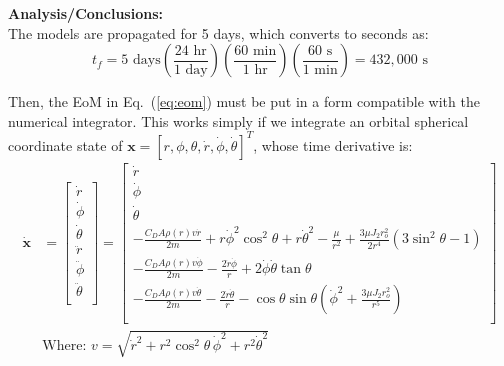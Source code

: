 \documentclass[titlepage]{article}
\begin{document}
\textbf{Analysis/Conclusions:}\\

The models are propagated for 5 days, which converts to seconds as:
\begin{equation}
	t_f=5\text{ days}\left(\frac{24\text{ hr}}{1\text{ day}}\right)\left(\frac{60\text{ min}}{1\text{ hr}}\right)\left(\frac{60\text{ s}}{1\text{ min}}\right)=432{,}000\text{ s}
\end{equation}

Then, the EoM in Eq.~(\ref{eq:eom}) must be put in a form compatible with the numerical integrator. This works simply if we integrate an orbital spherical coordinate state of $\boldsymbol{x}=[r,\phi,\theta,\dot{r},\dot{\phi},\dot{\theta}]^T$, whose time derivative is:
\begin{equation}
	\begin{split}
		\dot{\boldsymbol{x}}&=
		\begin{bmatrix}
			\dot{r} \\
			\dot{\phi} \\
			\dot{\theta} \\
			\ddot{r} \\
			\ddot{\phi} \\
			\ddot{\theta} \\
		\end{bmatrix}
		=
		\begin{bmatrix}
			\dot{r} \\
			\dot{\phi} \\
			\dot{\theta} \\
			-\frac{C_DA\rho(r)v\dot{r}}{2m}+r\dot{\phi}^2\cos^2\theta+r\dot{\theta}^2-\frac{\mu}{r^2}+\frac{3\mu J_2r_o^2}{2r^4}\left(3\sin^2\theta-1\right) \\
			-\frac{C_DA\rho(r)v\dot{\phi}}{2m}-\frac{2\dot{r}\dot{\phi}}{r}+2\dot{\phi}\dot{\theta}\tan\theta \\
			-\frac{C_DA\rho(r)v\dot{\theta}}{2m}-\frac{2\dot{r}\dot{\theta}}{r}-\cos\theta\sin\theta\left(\dot{\phi}^2+\frac{3\mu J_2r_o^2}{r^5}\right) \\
		\end{bmatrix} \\
		&\text{Where:  }v=\sqrt{\dot{r}^2+r^2\cos^2\theta\,\dot{\phi}^2+r^2\dot{\theta}^2}
	\end{split}
	\label{eq:stateomdrag}
\end{equation}
\end{document}
